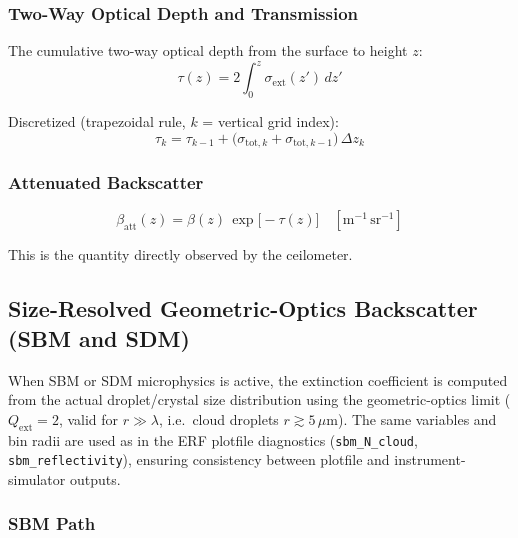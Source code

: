 \documentclass[11pt,letterpaper]{article}
\begin{document}
\subsubsection{Two-Way Optical Depth and Transmission}

The cumulative two-way optical depth from the surface to height $z$:
\begin{equation}
  \tau(z) = 2\int_0^z \sigma_\mathrm{ext}(z')\,dz'
  \label{eq:tau}
\end{equation}

Discretized (trapezoidal rule, $k$ = vertical grid index):
\begin{equation}
  \tau_k = \tau_{k-1} + \bigl(\sigma_{\mathrm{tot},k} + \sigma_{\mathrm{tot},k-1}\bigr)\,\Delta z_k
\end{equation}

\subsubsection{Attenuated Backscatter}

\begin{equation}
  \boxed{\beta_\mathrm{att}(z) = \beta(z)\,\exp\bigl[-\tau(z)\bigr]}
  \quad [\mathrm{m}^{-1}\,\mathrm{sr}^{-1}]
  \label{eq:beta_att}
\end{equation}

This is the quantity directly observed by the ceilometer.

\subsection{Size-Resolved Geometric-Optics Backscatter (SBM and SDM)}\label{sec:size_resolved}

When SBM or SDM microphysics is active, the extinction coefficient is computed from the
actual droplet/crystal size distribution using the geometric-optics limit ($Q_\mathrm{ext} = 2$,
valid for $r \gg \lambda$, i.e.\ cloud droplets $r \gtrsim 5\,\mu\mathrm{m}$).
The same variables and bin radii are used as in the ERF plotfile diagnostics
(\texttt{sbm\_N\_cloud}, \texttt{sbm\_reflectivity}), ensuring consistency between
plotfile and instrument-simulator outputs.

\subsubsection{SBM Path}
\end{document}
